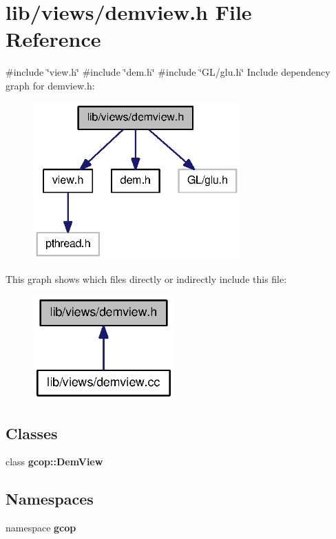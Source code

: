 \section{lib/views/demview.h \-File \-Reference}
\label{demview_8h}
{\ttfamily \#include \char`\"{}view.\-h\char`\"{}}\*
{\ttfamily \#include \char`\"{}dem.\-h\char`\"{}}\*
{\ttfamily \#include \char`\"{}\-G\-L/glu.\-h\char`\"{}}\*
\-Include dependency graph for demview.\-h\-:
\nopagebreak
\begin{figure}[H]
\begin{center}
\leavevmode
\includegraphics[width=226pt]{demview_8h__incl}
\end{center}
\end{figure}
\-This graph shows which files directly or indirectly include this file\-:
\nopagebreak
\begin{figure}[H]
\begin{center}
\leavevmode
\includegraphics[width=154pt]{demview_8h__dep__incl}
\end{center}
\end{figure}
\subsection*{\-Classes}
\begin{DoxyCompactItemize}
\item 
class {\bf gcop\-::\-Dem\-View}
\end{DoxyCompactItemize}
\subsection*{\-Namespaces}
\begin{DoxyCompactItemize}
\item 
namespace {\bf gcop}
\end{DoxyCompactItemize}
